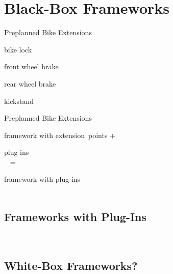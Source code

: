 \documentclass[
	aspectratio=169, %
	8pt, %
	handout, %
]{beamer}
\begin{document}
\sectionend

\section{Black-Box Frameworks}

\begin{frame}{Preplanned Bike Extensions}
	\begin{mycolumns}[columns=4,T]
		\centering{}

		bike lock
	\mynextcolumn
		\centering{}

		front wheel brake
	\mynextcolumn
		\centering{}

		rear wheel brake
	\mynextcolumn
		\centering{}

		kickstand
	\end{mycolumns}
\end{frame}

\begin{frame}{Preplanned Bike Extensions}
	\begin{mycolumns}[columns=5,widths={30,5,30,5,30}]
		\centering{}

		framework with extension~points
	\mynextcolumn
		\centering\Huge +
	\mynextcolumn
		\centering{}

		plug-ins\\~
	\mynextcolumn
		\centering\Huge =
	\mynextcolumn
		\centering{}

		framework with plug-ins\\~
	\end{mycolumns}
\end{frame}

\subsection{Frameworks with Plug-Ins}
\begin{frame}{\myframetitle\ \mytitlesource{\featureide}}
\end{frame}

\subsection{White-Box Frameworks?}

\lessonslearned{
	\item \ldots
}{
	\item \ldots
}{
	\ldots
}


\end{document}
